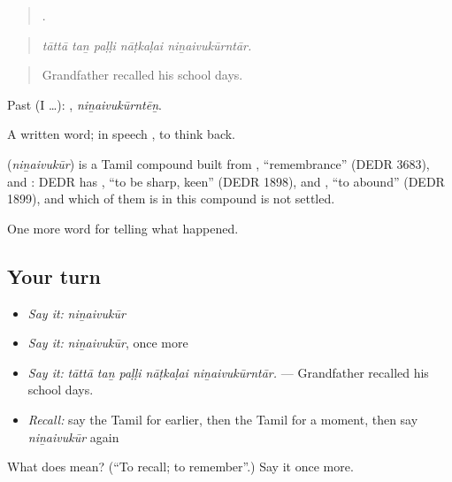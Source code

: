 \begin{quote}
    .
\end{quote}

\begin{quote}
\emph{tāttā taṉ paḷḷi nāṭkaḷai niṉaivukūrntār.}
\end{quote}

\begin{quote}
Grandfather recalled his school days.
\end{quote}

Past (I …): , \emph{niṉaivukūrntēṉ}.

A written word; in speech  , to think back.

\begin{cousinweb}
\textbf{} (\emph{niṉaivukūr}) is a Tamil compound built from , \textquotedblleft{}remembrance\textquotedblright{} (DEDR 3683), and : DEDR has , \textquotedblleft{}to be sharp, keen\textquotedblright{} (DEDR 1898), and , \textquotedblleft{}to abound\textquotedblright{} (DEDR 1899), and which of them is in this compound is not settled.
\end{cousinweb}

\begin{grammarlens}[title={What you've built}]
One more word for telling what happened.
\end{grammarlens}

\subsection*{Your turn}
\begin{itemize}
\raggedright
  \item \emph{Say it:} \emph{niṉaivukūr}
  \item \emph{Say it:} \emph{niṉaivukūr}, once more
  \item \emph{Say it:} \emph{tāttā taṉ paḷḷi nāṭkaḷai niṉaivukūrntār.} — Grandfather recalled his school days.
  \item \emph{Recall:} say the Tamil for earlier, then the Tamil for a moment, then say \emph{niṉaivukūr} again
\end{itemize}

\begin{tcolorbox}[breakable,colback=teal!4,colframe=teal!35!black,title={Before you move on}]
What does  mean? (\textquotedblleft{}To recall; to remember\textquotedblright{}.) Say it once more.
\end{tcolorbox}
